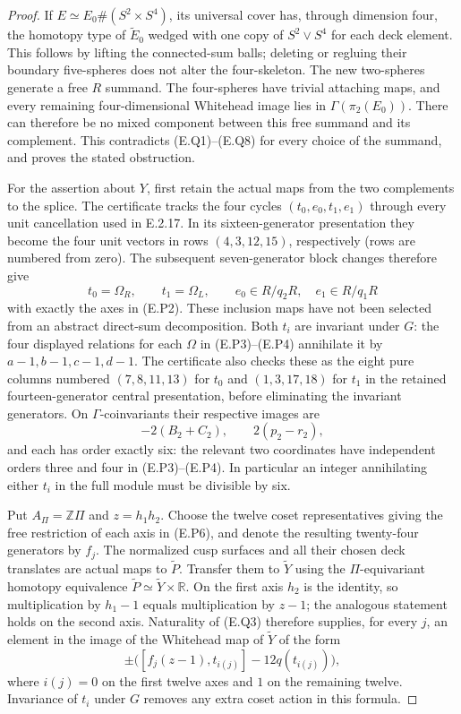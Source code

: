 \begin{proof}
If $E\simeq E_0\#(S^2\times S^4)$, its universal cover
has, through dimension four, the homotopy type of
$\widetilde E_0$ wedged with one copy of $S^2\vee S^4$
for each deck element.  This follows by lifting the
connected-sum balls; deleting or regluing their boundary
five-spheres does not alter the four-skeleton.  The new
two-spheres generate a free $R$ summand.  The four-spheres
have trivial attaching maps, and every remaining
four-dimensional Whitehead image lies in
$\Gamma(\pi_2(E_0))$.  There can therefore be no mixed
component between this free summand and its complement.
This contradicts (E.Q1)--(E.Q8) for every choice of the
summand, and proves the stated obstruction.

For the assertion about $Y$, first retain the actual maps
from the two complements to the splice.  The certificate
 tracks the four cycles
$(t_0,e_0,t_1,e_1)$ through every unit cancellation used in
E.2.17.  In its sixteen-generator presentation they become
the four unit vectors in rows $(4,3,12,15)$, respectively
(rows are numbered from zero).  The subsequent seven-generator
block changes therefore give
\[
 t_0=\Omega_R,\qquad t_1=\Omega_L,
 \qquad e_0\in R/q_2R,\quad e_1\in R/q_1R
 \tag{E.Q9}
\]
with exactly the axes in (E.P2).  These inclusion maps have
not been selected from an abstract direct-sum decomposition.
Both $t_i$ are invariant under $G$: the four displayed
relations for each $\Omega$ in (E.P3)--(E.P4) annihilate
it by $a-1,b-1,c-1,d-1$.  The certificate also checks these
as the eight pure columns numbered
$(7,8,11,13)$ for $t_0$ and $(1,3,17,18)$ for $t_1$
in the retained fourteen-generator central presentation,
before eliminating the invariant generators.
On $\Gamma$-coinvariants
their respective images are
\[
 -2(B_2+C_2),\qquad 2(p_2-r_2),
 \tag{E.Q10}
\]
and each has order exactly six: the relevant two coordinates
have independent orders three and four in (E.P3)--(E.P4).
In particular an integer annihilating either $t_i$ in the
full module must be divisible by six.

Put $A_\Pi=\mathbb Z\Pi$ and $z=h_1h_2$.  Choose the twelve
coset representatives giving the free restriction of each
axis in (E.P6), and denote the resulting twenty-four generators
by $f_j$.  The normalized cusp surfaces and all their chosen
deck translates are actual maps to $\widetilde P$.  Transfer
them to $\widetilde Y$ using the $\Pi$-equivariant homotopy
equivalence $\widetilde P\simeq\widetilde Y\times\mathbb R$.
On the first axis $h_2$ is the identity, so multiplication
by $h_1-1$ equals multiplication by $z-1$; the analogous
statement holds on the second axis.  Naturality of (E.Q3)
therefore supplies, for every $j$, an element in the image
of the Whitehead map of $\widetilde Y$ of the form
\[
 \pm\bigl([f_j(z-1),t_{i(j)}]-12q(t_{i(j)})\bigr),
 \tag{E.Q11}
\]
where $i(j)=0$ on the first twelve axes and $1$ on the
remaining twelve.  Invariance of $t_i$ under $G$ removes
any extra coset action in this formula.


\end{proof}
